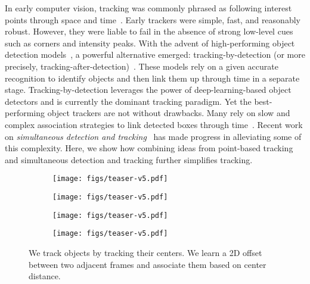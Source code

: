 \documentclass[runningheads]{llncs}
\newcommand{\lblfig}[1]{\label{fig:#1}}
\begin{document}
In early computer vision, tracking was commonly phrased as following interest points through space and time~\cite{tomasi1991detection,shi1994good}.
Early trackers were simple, fast, and reasonably robust.
However, they were liable to fail in the absence of strong low-level cues such as corners and intensity peaks.
With the advent of high-performing object detection models~\cite{felzenszwalb2009object,ren2015faster}, a powerful alternative emerged: tracking-by-detection (or more precisely, tracking-after-detection)~\cite{Bewley2016_sort,tang2017multiple,xu2019spatial}.
These models rely on a given accurate recognition to identify objects and then link them up through time in a separate stage.
Tracking-by-detection leverages the power of deep-learning-based object detectors and is currently the dominant tracking paradigm. Yet the best-performing object trackers are not without drawbacks. Many rely on slow and complex association strategies to link detected boxes through time~\cite{xiang2015learning,Hu3DT19,tang2017multiple,xu2019spatial}. 
Recent work on \emph{simultaneous detection and tracking}~\cite{bergmann2019tracking,feichtenhofer2017detect} has made progress in alleviating some of this complexity.
Here, we show how combining ideas from point-based tracking and simultaneous detection and tracking further simplifies tracking.

\begin{figure}[t]
\captionsetup{type=figure}
\centering
  \begin{subfigure}[t]{0.25\linewidth}
   \texttt{[image: figs/teaser-v5.pdf]}
  \end{subfigure}\begin{subfigure}[t]{0.25\linewidth}
   \texttt{[image: figs/teaser-v5.pdf]}
  \end{subfigure}\begin{subfigure}[t]{0.25\linewidth}
   \texttt{[image: figs/teaser-v5.pdf]}
  \end{subfigure}\begin{subfigure}[t]{0.25\linewidth}
   \texttt{[image: figs/teaser-v5.pdf]}
  \end{subfigure}\caption{We track objects by tracking their centers. We learn a 2D offset between two adjacent frames and associate them based on center distance.}
   \lblfig{teaser}
\vspace{-7mm}
\end{figure}
\end{document}

